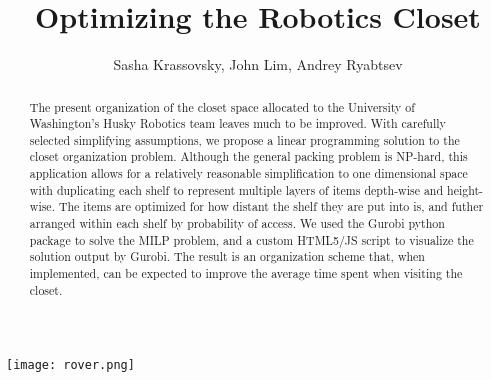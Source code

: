 \documentclass[10pt]{article}
\title{Optimizing the Robotics Closet}
\author{Sasha Krassovsky, John Lim, Andrey Ryabtsev}
\theoremstyle{named}
\begin{document}
\maketitle
\begin{abstract}
The present organization of the closet space allocated to the University of Washington's Husky Robotics team leaves much to be improved. With carefully selected simplifying assumptions, we propose a linear programming solution to the closet organization problem. Although the general packing problem is NP-hard, this application allows for a relatively reasonable simplification to one dimensional space with duplicating each shelf to represent multiple layers of items depth-wise and height-wise. The items are optimized for how distant the shelf they are put into is, and futher arranged within each shelf by probability of access. We used the Gurobi python package to solve the MILP problem, and a custom HTML5/JS script to visualize the solution output by Gurobi. The result is an organization scheme that, when implemented, can be expected to improve the average time spent when visiting the closet.
\end{abstract}
\begin{center}
\texttt{[image: rover.png]}
\end{center}
\pagebreak
\end{document}
